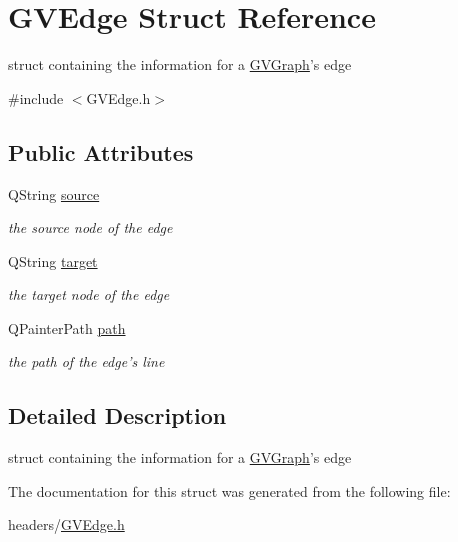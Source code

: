 \hypertarget{struct_g_v_edge}{\section{\-G\-V\-Edge \-Struct \-Reference}
\label{struct_g_v_edge}
}


struct containing the information for a \hyperlink{class_g_v_graph}{\-G\-V\-Graph}'s edge  




{\ttfamily \#include $<$\-G\-V\-Edge.\-h$>$}

\subsection*{\-Public \-Attributes}
\begin{DoxyCompactItemize}
\item 
\hypertarget{struct_g_v_edge_a7a3538b20c3747135ce4771be00a3a8a}{\-Q\-String \hyperlink{struct_g_v_edge_a7a3538b20c3747135ce4771be00a3a8a}{source}}\label{struct_g_v_edge_a7a3538b20c3747135ce4771be00a3a8a}

\begin{DoxyCompactList}\small\item\em the source node of the edge \end{DoxyCompactList}\item 
\hypertarget{struct_g_v_edge_a6883e0ddce3a6fcbde0b01f3645ae7c5}{\-Q\-String \hyperlink{struct_g_v_edge_a6883e0ddce3a6fcbde0b01f3645ae7c5}{target}}\label{struct_g_v_edge_a6883e0ddce3a6fcbde0b01f3645ae7c5}

\begin{DoxyCompactList}\small\item\em the target node of the edge \end{DoxyCompactList}\item 
\hypertarget{struct_g_v_edge_ad73f00af1e82b13f9c94982327bc9952}{\-Q\-Painter\-Path \hyperlink{struct_g_v_edge_ad73f00af1e82b13f9c94982327bc9952}{path}}\label{struct_g_v_edge_ad73f00af1e82b13f9c94982327bc9952}

\begin{DoxyCompactList}\small\item\em the path of the edge's line \end{DoxyCompactList}\end{DoxyCompactItemize}


\subsection{\-Detailed \-Description}
struct containing the information for a \hyperlink{class_g_v_graph}{\-G\-V\-Graph}'s edge 

\-The documentation for this struct was generated from the following file\-:\begin{DoxyCompactItemize}
\item 
headers/\hyperlink{_g_v_edge_8h}{\-G\-V\-Edge.\-h}\end{DoxyCompactItemize}
